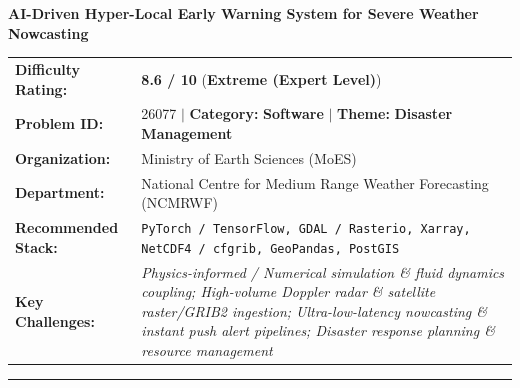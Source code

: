 \documentclass[10pt,a4paper]{article}
\begin{document}
\begin{tcolorbox}[pscard, title={"\textbf{SIH26077} \quad $\vert$ \quad AI-Driven Hyper-Local Early Warning System for Severe Weather Nowcasting}]
\textbf{\large AI-Driven Hyper-Local Early Warning System for Severe Weather Nowcasting}\\[0.25cm]

\begin{tabular}{@{}lp{12.5cm}@{}}
\textbf{Difficulty Rating:} & \textcolor{diffextreme}{\textbf{\Large 8.6 / 10}} \quad (\textbf{Extreme (Expert Level)}) \\
\textbf{Problem ID:} & 26077 \quad $\vert$ \quad \textbf{Category:} \textbf{Software} \quad $\vert$ \quad \textbf{Theme:} \textbf{Disaster Management} \\
\textbf{Organization:} & Ministry of Earth Sciences (MoES) \\
\textbf{Department:} & National Centre for Medium Range Weather Forecasting (NCMRWF) \\
\textbf{Recommended Stack:} & \texttt{PyTorch / TensorFlow, GDAL / Rasterio, Xarray, NetCDF4 / cfgrib, GeoPandas, PostGIS} \\
\textbf{Key Challenges:} & \textit{\small Physics-informed / Numerical simulation \& fluid dynamics coupling; High-volume Doppler radar \& satellite raster/GRIB2 ingestion; Ultra-low-latency nowcasting \& instant push alert pipelines; Disaster response planning \& resource management} \\
\end{tabular}

\vspace{0.2cm}
\hrule
\vspace{0.2cm}


\end{tcolorbox}
\end{document}
